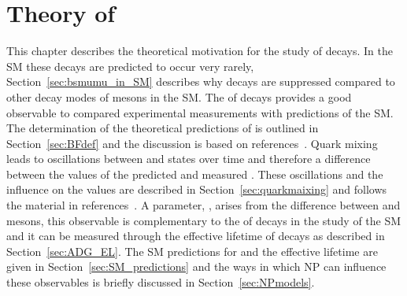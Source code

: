 \chapter{{\bf Theory of }}
\label{sec:theory_chptr}
This chapter describes the theoretical motivation for the study of \bmumu decays. 
In the SM these decays are predicted to occur very rarely, Section~\ref{sec:bsmumu_in_SM} describes why \bmumu decays are suppressed compared to other decay modes of \bsd mesons in the SM. The \BF of \bmumu decays provides a good observable to compared experimental measurements with predictions of the SM. The determination of the theoretical predictions of \BFs is outlined in Section~\ref{sec:BFdef} and the discussion is based on references~\cite{Blake:2016olu,Anikeev:2001rk}.
Quark mixing leads to oscillations between \bs and \barbs states over time and therefore a difference between the values of the predicted and measured \bsmumu \BFs. These oscillations and the influence on the \BFs values are described in Section~\ref{sec:quarkmaixing} and follows the material in references~\cite{ Anikeev:2001rk,Dunietz:2000cr,Nierste:2009wg}. 
A parameter, \ADG, arises from the difference between \bs and \barbs mesons, this observable is complementary to the \BF of \bsmumu decays in the study of the SM and it can be measured through the effective lifetime of \bsmumu decays as described in Section~\ref{sec:ADG_EL}. The SM predictions for \bmumu \BFs and the \bsmumu effective lifetime are given in Section~\ref{sec:SM_predictions} and the ways in which NP can influence these observables is briefly discussed in Section~\ref{sec:NPmodels}.



